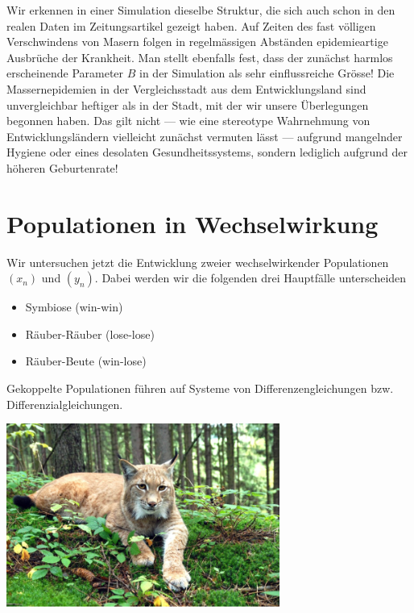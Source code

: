 \documentclass[%
11pt,%
twoside,%
titlepage,%
german,%
headsepline%
]{scrartcl}
\begin{document}
Wir erkennen in einer Simulation dieselbe Struktur, die sich auch schon in den realen Daten im Zeitungsartikel gezeigt haben. Auf Zeiten des fast völligen Verschwindens von Masern folgen in regelmässigen Abständen epidemieartige Ausbrüche der Krankheit. Man stellt ebenfalls fest, dass der zunächst harmlos erscheinende Parameter $B$ in der Simulation als sehr einflussreiche Grösse! Die Massernepidemien in der Vergleichsstadt aus dem Entwicklungsland sind unvergleichbar heftiger als in der Stadt, mit der wir unsere Überlegungen begonnen haben. Das gilt nicht --- wie eine stereotype Wahrnehmung von Entwicklungsländern vielleicht zunächst vermuten lässt --- aufgrund mangelnder Hygiene oder eines desolaten Gesundheitssystems, sondern lediglich aufgrund der höheren Geburtenrate!

\clearpage

\section{Populationen in Wechselwirkung}
Wir
untersuchen jetzt die Entwicklung zweier wechselwirkender Populationen $(x_n)$ und $(y_n)$. Dabei werden wir die folgenden drei Hauptfälle unterscheiden

\begin{itemize}
\item Symbiose (win-win)
\item Räuber-Räuber (lose-lose)
\item Räuber-Beute (win-lose)
\end{itemize}

Gekoppelte Populationen führen auf Systeme von Differenzengleichungen bzw. Differenzialgleichungen.

\begin{center}
\includegraphics[height=6cm]{pictures/luchs.jpg}
\end{center}
\end{document}
